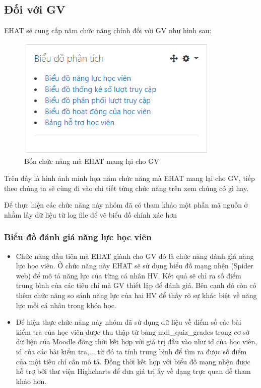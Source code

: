 \subsection{Đối với GV}

EHAT sẽ cung cấp năm chức năng chính đối với GV như hình sau:

\begin{center}
	\begin{figure}[htp]
		\begin{center}
			\includegraphics[scale=1]{img/gvtool}
		\end{center}
		\caption{Bốn chức năng mà EHAT mang lại cho GV}
		\label{refhinh27}
	\end{figure}
\end{center}

Trên đây là hình ảnh minh họa năm chức năng mà EHAT mang lại cho GV, tiếp theo chúng ta sẽ cùng đi vào chi tiết từng chức năng trên xem chúng có gì hay.

Để thực hiện các chức năng này nhóm đã có tham khảo một phần mã nguồn ở \cite{code} nhằm lấy dữ liệu từ log file để vẽ biểu đồ chính xác hơn

\subsubsection{Biểu đồ đánh giá năng lực học viên}
\begin{itemize}
	\item Chức năng đầu tiên mà EHAT giành cho GV đó là chức năng đánh giá năng lực học viên. Ở chức năng này EHAT sẽ sử dụng biểu đồ mạng nhện (Spider web) để mô tả năng lực của từng cá nhân HV. Kết quả sẽ chỉ ra số điểm trung bình của các tiêu chí mà GV thiết lập để đánh giá. Bên cạnh đó còn có thêm chức năng so sánh năng lực của hai HV để thấy rõ sự khác biệt về năng lực mỗi cá nhân trong khóa học.
	
	\item Để hiện thực chức năng này nhóm đã sử dụng dữ liệu về điểm số các bài kiểm tra của học viên được thu thập từ bảng mdl\_quiz\_grades trong cơ sở dữ liệu của Moodle đồng thời kết hợp với giá trị đầu vào như id của học viên, id của các bài kiểm tra,... từ đó ta tính trung bình để tìm ra được số điểm của một tiêu chí cần mô tả. Đồng thời kết hợp với biểu đồ mạng nhện được hỗ trợ bởi thư viện Highcharts để đưa giá trị ấy về dạng trực quan dễ tham khảo hơn.
\end{itemize}

